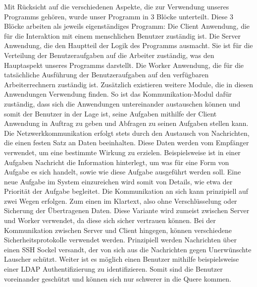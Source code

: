 \documentclass[a4paper,12pt]{article}
\begin{document}
Mit Rücksicht auf die verschiedenen Aspekte, die zur Verwendung unseres Programms gehören, wurde unser Programm in 3 Blöcke unterteilt. Diese 3 Blöcke arbeiten als jeweils eigenständiges Programm:\newline
Die Client Anwendung, die für die Interaktion mit einem menschlichen Benutzer zuständig ist.\newline
Die Server Anwendung, die den Hauptteil der Logik des Programms ausmacht. Sie ist für die Verteilung der Benutzeraufgaben auf die Arbeiter zuständig, was den Hauptaspekt unseres Programms darstellt.\newline
Die Worker Anwendung, die für die tatsächliche Ausführung der Benutzeraufgaben auf den verfügbaren Arbeiterrechnern zuständig ist.\newline
\newline
Zusätzlich existieren weitere Module, die in diesen Anwendungen Verwendung finden. So ist das Kommunikation-Modul dafür zuständig, dass sich die Anwendungen untereinander austauschen können und somit der Benutzer in der Lage ist, seine Aufgaben mithilfe der Client Anwendung in Auftrag zu geben und Abfragen zu seinen Aufgaben stellen kann.\newline
Die Netzwerkkommunikation erfolgt stets durch den Austausch von Nachrichten, die einen festen Satz an Daten beeinhalten. Diese Daten werden vom Empfänger verwendet, um eine bestimmte Wirkung zu erzielen. Beispielsweise ist in einer Aufgaben Nachricht die Information hinterlegt, um was für eine Form von Aufgabe es sich handelt, sowie wie diese Aufgabe ausgeführt werden soll. Eine neue Aufgabe im System einzureichen wird somit von Details, wie etwa der Priorität der Aufgabe begleitet.
\newline
Die Kommunikation an sich kann prinzipiell auf zwei Wegen erfolgen. Zum einen im Klartext, also ohne Verschlüsselung oder Sicherung der Übertragenen Daten. Diese Variante wird zumeist zwischen Server und Worker verwendet, da diese sich sicher vertrauen können. Bei der Kommunikation zwischen Server und Client hingegen, können verschiedene Sicherheitsprotokolle verwendet werden. Prinzipiell werden Nachrichten über einen SSH Sockel versandt, der von sich aus die Nachrichten gegen Unerwünschte Lauscher schützt. Weiter ist es möglich einen Benutzer mithilfe beispielsweise einer LDAP Authentifizierung zu identifizieren. Somit sind die Benutzer voreinander geschützt und können sich nur schwerer in die Quere kommen.
\newline\newline
\end{document}
